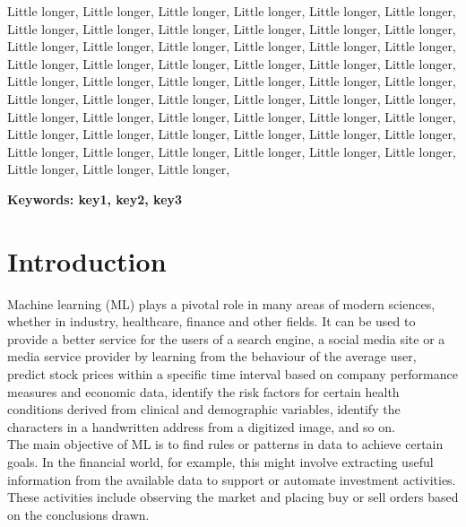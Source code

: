 \documentclass[a4paper,oneside,onecolumn,12pt]{LegrandOrangeBook}
\newcommand{\comment}[1]{{\textcolor{red}{#1}}}
\newcommand{\commentaron}[1]{{\textcolor{blue}{#1}}}
\begin{document}
Little longer, Little longer, Little longer, Little longer, Little longer, Little longer, Little longer, Little longer, Little longer, Little longer, Little longer, Little longer, Little longer, Little longer, Little longer, Little longer, Little longer, Little longer, Little longer, Little longer, Little longer, Little longer, Little longer, Little longer, Little longer, Little longer, Little longer, Little longer, Little longer, Little longer, Little longer, Little longer, Little longer, Little longer, Little longer, Little longer, Little longer, Little longer, Little longer, Little longer, Little longer, Little longer, Little longer, Little longer, Little longer, Little longer, Little longer, Little longer, Little longer, Little longer, Little longer, Little longer, Little longer, Little longer, Little longer, Little longer, Little longer, 

\textbf{Keywords: key1, key2, key3}

\pagebreak

\chapter*{Introduction}


Machine learning (ML) plays a pivotal role in many areas of modern sciences, whether in industry, healthcare, finance and other fields. It can be used to provide a better service for the users of a search engine, a social media site or a media service provider by learning from the behaviour of the average user, predict stock prices within a specific time interval based on company performance measures and economic data, identify the risk factors for certain health conditions derived from clinical and demographic variables, identify the characters in a handwritten address from a digitized image, and so on. \cite{TESL}\\
The main objective of ML is to find rules or patterns in data to achieve certain goals. In the financial world, for example, this might involve extracting useful information from the available data to support or automate investment activities. These activities include observing the market and placing buy or sell orders based on the conclusions drawn. \cite{MLAT}
\end{document}
